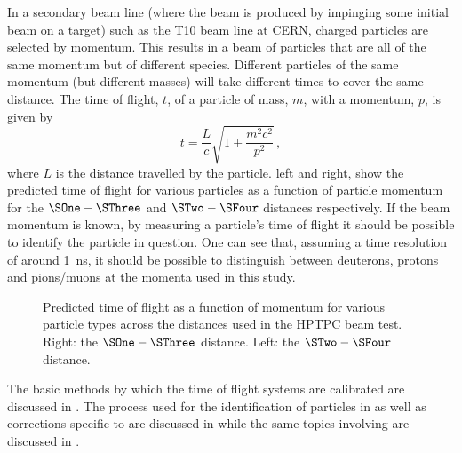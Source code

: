 In a secondary beam line (where the beam is produced by impinging some initial beam on a target) such as the T10 beam line at CERN, charged particles are selected by momentum.
This results in a beam of particles that are all of the same momentum but of different species.
Different particles of the same momentum (but different masses) will take different times to cover the same distance.
The time of flight, $t$, of a particle of mass, $m$, with a momentum, $p$, is given by
\begin{equation}
  t = \frac{L}{c} \sqrt{ 1 + \frac{m^{2}c^{2}}{p^{2}} }\, ,
  \label{eq:tof}
\end{equation}
where $L$ is the distance travelled by the particle.
 left and right, show the predicted time of flight for various particles as a function of particle momentum for the $\SOne - \SThree$ and  $\STwo - \SFour$ distances respectively.
If the beam momentum is known, by measuring a particle's time of flight it should be possible to identify the particle in question.
One can see that, assuming a time resolution of around \SI{1}{\nano\second}, it should be possible to distinguish between deuterons, protons and pions/muons at the momenta used in this study.

\begin{figure}[h]
  \begin{minipage}[t]{.5\linewidth}
    \begin{adjustbox}{max totalsize=\textwidth, center}
      
    \end{adjustbox}
  \end{minipage}
  \hfill
  \begin{minipage}[t]{.5\linewidth}
    \begin{adjustbox}{max totalsize=\textwidth, center}
      
    \end{adjustbox}
  \end{minipage}
  \caption[Predicted time of flight as a function of momentum for various particle types across the distances used in the HPTPC beam test.]{Predicted time of flight as a function of momentum for various particle types across the distances used in the HPTPC beam test. Right: the $\SOne - \SThree$ distance. Left: the $\STwo - \SFour$ distance.}
  \label{fig:tofVsMom}
\end{figure}

The basic methods by which the time of flight systems are calibrated are discussed in .
The process used for the identification of particles in \SThree as well as corrections specific to \SThree are discussed in  while the same topics involving \SFour are discussed in .

